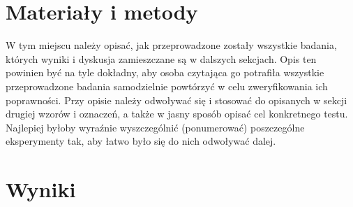 \documentclass{classrep}
\begin{document}
\section{Materiały i metody}
{\color{blue}
W tym miejscu należy opisać, jak przeprowadzone zostały wszystkie badania,
których wyniki i dyskusja zamieszczane są w dalszych sekcjach. Opis ten
powinien być na tyle dokładny, aby osoba czytająca go potrafiła wszystkie
przeprowadzone badania samodzielnie powtórzyć w celu zweryfikowania ich
poprawności. Przy opisie należy odwoływać się i stosować do
opisanych w sekcji drugiej wzorów i oznaczeń, a także w jasny sposób opisać
cel konkretnego testu. Najlepiej byłoby wyraźnie wyszczególnić (ponumerować)
poszczególne eksperymenty tak, aby łatwo było się do nich odwoływać dalej.}

\section{Wyniki}
\end{document}
